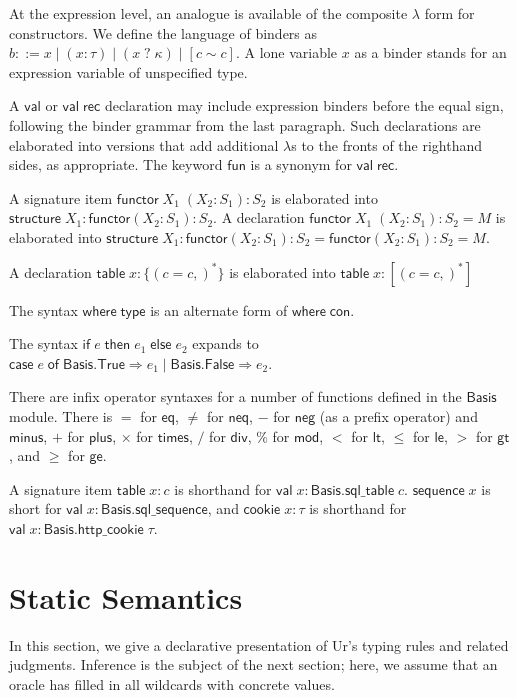 \documentclass{article}
\newcommand{\mt}[1]{\mathsf{#1}}
\begin{document}
At the expression level, an analogue is available of the composite $\lambda$ form for constructors.  We define the language of binders as $b ::= x \mid (x : \tau) \mid (x \; ? \; \kappa) \mid [c \sim c]$.  A lone variable $x$ as a binder stands for an expression variable of unspecified type.

A $\mt{val}$ or $\mt{val} \; \mt{rec}$ declaration may include expression binders before the equal sign, following the binder grammar from the last paragraph.  Such declarations are elaborated into versions that add additional $\lambda$s to the fronts of the righthand sides, as appropriate.  The keyword $\mt{fun}$ is a synonym for $\mt{val} \; \mt{rec}$.

A signature item $\mt{functor} \; X_1 \; (X_2 : S_1) : S_2$ is elaborated into $\mt{structure} \; X_1 : \mt{functor}(X_2 : S_1) : S_2$.  A declaration $\mt{functor} \; X_1 \; (X_2 : S_1) : S_2 = M$ is elaborated into $\mt{structure} \; X_1 : \mt{functor}(X_2 : S_1) : S_2 = \mt{functor}(X_2 : S_1) : S_2 = M$.

A declaration $\mt{table} \; x : \{(c = c,)^*\}$ is elaborated into $\mt{table} \; x : [(c = c,)^*]$

The syntax $\mt{where} \; \mt{type}$ is an alternate form of $\mt{where} \; \mt{con}$.

The syntax $\mt{if} \; e \; \mt{then} \; e_1 \; \mt{else} \; e_2$ expands to $\mt{case} \; e \; \mt{of} \; \mt{Basis}.\mt{True} \Rightarrow e_1 \mid \mt{Basis}.\mt{False} \Rightarrow e_2$.

There are infix operator syntaxes for a number of functions defined in the $\mt{Basis}$ module.  There is $=$ for $\mt{eq}$, $\neq$ for $\mt{neq}$, $-$ for $\mt{neg}$ (as a prefix operator) and $\mt{minus}$, $+$ for $\mt{plus}$, $\times$ for $\mt{times}$, $/$ for $\mt{div}$, $\%$ for $\mt{mod}$, $<$ for $\mt{lt}$, $\leq$ for $\mt{le}$, $>$ for $\mt{gt}$, and $\geq$ for $\mt{ge}$.

A signature item $\mt{table} \; x : c$ is shorthand for $\mt{val} \; x : \mt{Basis}.\mt{sql\_table} \; c$.  $\mt{sequence} \; x$ is short for $\mt{val} \; x : \mt{Basis}.\mt{sql\_sequence}$, and $\mt{cookie} \; x : \tau$ is shorthand for $\mt{val} \; x : \mt{Basis}.\mt{http\_cookie} \; \tau$.


\section{Static Semantics}

In this section, we give a declarative presentation of Ur's typing rules and related judgments.  Inference is the subject of the next section; here, we assume that an oracle has filled in all wildcards with concrete values.
\end{document}
